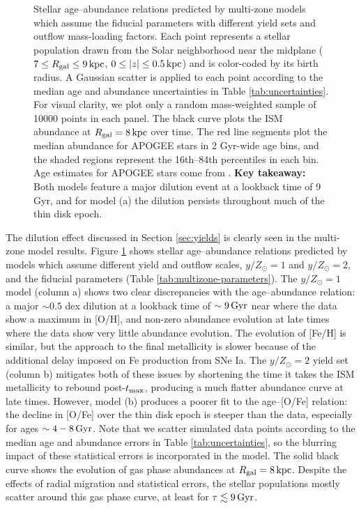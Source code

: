 \documentclass[twocolumn,twocolappendix,linenumbers]{aastex631}
\newcommand{\yZ}[1]{$y/Z_\odot=#1$}
\newcommand{\kpc}{\,{\rm kpc}}
\newcommand{\Gyr}{\,{\rm Gyr}}
\begin{document}
\begin{figure}
    \caption{Stellar age--abundance relations predicted by multi-zone models which assume the fiducial parameters with different yield sets and outflow mass-loading factors. Each point represents a stellar population drawn from the Solar neighborhood near the midplane ($7\leq R_{\rm gal}\leq 9\kpc$, $0\leq |z| \leq 0.5\kpc$) and is color-coded by its birth radius. A Gaussian scatter is applied to each point according to the median age and abundance uncertainties in Table \ref{tab:uncertainties}. For visual clarity, we plot only a random mass-weighted sample of \num{10000} points in each panel. The black curve plots the ISM abundance at $R_{\rm gal}=8\kpc$ over time. The red line segments plot the median abundance for APOGEE stars in {2 Gyr}-wide age bins, and the shaded regions represent the 16th--84th percentiles in each bin. Age estimates for APOGEE stars come from \citet{leung_variational_2023}. {\bf Key takeaway:} Both models feature a major dilution event at a lookback time of 9 Gyr, and for model (a) the dilution persists throughout much of the thin disk epoch.}
    \label{fig:abundance-evolution-yields}
\end{figure}

The dilution effect discussed in Section \ref{sec:yields} is clearly seen in the multi-zone model results. Figure \ref{fig:abundance-evolution-yields} shows stellar age--abundance relations predicted by models which assume different yield and outflow scales, \yZ{1} and \yZ{2}, and the fiducial parameters (Table \ref{tab:multizone-parameters}). The \yZ{1} model (column a) shows two clear discrepancies with the \citet{leung_variational_2023} age--abundance relation: a major $\sim0.5$ dex dilution at a lookback time of $\sim9\,{\rm Gyr}$ near where the data show a maximum in [O/H], and non-zero abundance evolution at late times where the data show very little abundance evolution. The evolution of [Fe/H] is similar, but the approach to the final metallicity is slower because of the additional delay imposed on Fe production from SNe Ia. The \yZ{2} yield set (column b) mitigates both of these issues by shortening the time it takes the ISM metallicity to rebound post-$t_{\rm max}$, producing a much flatter abundance curve at late times. However, model (b) produces a poorer fit to the age--[O/Fe] relation: the decline in [O/Fe] over the thin disk epoch is steeper than the data, especially for ages $\sim4-8\,{\rm Gyr}$. Note that we scatter simulated data points according to the median age and abundance errors in Table \ref{tab:uncertainties}, so the blurring impact of these statistical errors is incorporated in the model. The solid black curve shows the evolution of gas phase abundances at $R_{\rm gal}=8\kpc$. Despite the effects of radial migration and statistical errors, the stellar populations mostly scatter around this gas phase curve, at least for $\tau\lesssim9\Gyr$.
\end{document}
